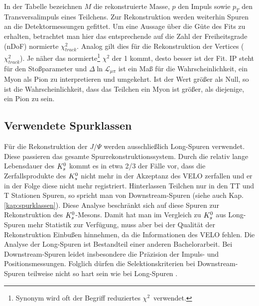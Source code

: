 In der Tabelle bezeichnen $M$ die rekonstruierte Masse, $p$ den Impuls sowie $p_T$ den Transversalimpuls eines Teilchens. Zur Rekonstruktion werden weiterhin Spuren an die Detektormessungen gefittet. Um eine Aussage über die Güte des Fits zu erhalten, betrachtet man hier das entsprechende auf die Zahl der Freiheitsgrade (nDoF) normierte $\chi_{track}^2$. Analog gilt dies für die Rekonstruktion der Vertices ($\chi_{track}^2$). Je näher das normierte\footnote{Synonym wird oft der Begriff \glqq reduziertes  $\chi^2$\grqq\ verwendet.} $\chi^2$ der 1 kommt, desto besser ist der Fit. IP steht für den Stoßparameter und $\Delta \ln \mathcal{L}_{\mu\pi}$ ist ein Maß für die Wahrscheinlichkeit, ein Myon als Pion zu interpretieren und umgekehrt. Ist der Wert größer als Null, so ist die Wahrscheinlichkeit, dass das Teilchen ein Myon ist größer, als diejenige, ein Pion zu sein.

\subsection{Verwendete Spurklassen} \label{kap:downstream}
Für die Rekonstruktion der $J/\Psi$ werden ausschließlich \glqq Long\grqq-Spuren verwendet. Diese passieren das gesamte Spurrekonstruktionssystem. Durch die relativ lange Lebensdauer des $K_s^0$ kommt es in etwa 2/3 der Fälle vor, dass die Zerfallsprodukte des $K_s^0$ nicht mehr in der Akzeptanz des VELO zerfallen und er in der Folge diese nicht mehr registriert. Hinterlassen Teilchen nur in den TT und T Stationen Spuren, so spricht man von \glqq Downstream\grqq-Spuren (siehe auch Kap. \ref{kap:spurklassen}). Diese Analyse beschränkt sich auf diese Spuren zur Rekonstruktion des $K_s^0$-Mesons. Damit hat man im Vergleich zu $K_s^0$ aus Long-Spuren mehr Statistik zur Verfügung, muss aber bei der Qualität der Rekonstruktion Einbußen hinnehmen, da die Informationen des VELO fehlen. Die Analyse der Long-Spuren ist Bestandteil einer anderen Bachelorarbeit. Bei Downstream-Spuren leidet insbesondere die Präzision der Impuls- und Positionsmessungen. Folglich dürfen die Selektionskriterien bei Downstream-Spuren teilweise nicht so hart sein wie bei Long-Spuren \cite{lhcb-paper}.

